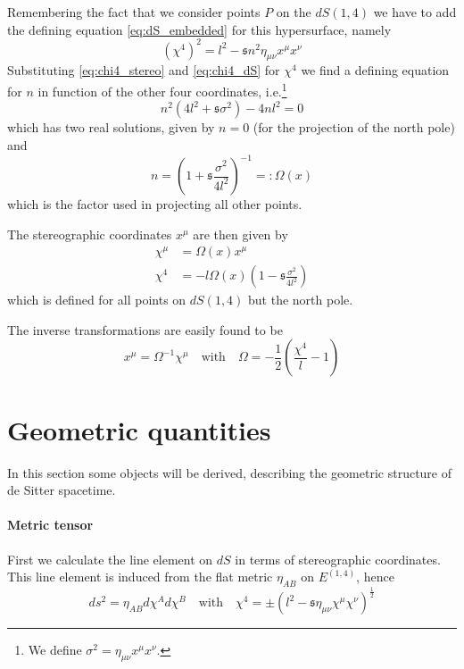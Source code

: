 \documentclass[10pt]{article}
\newcommand{\mrm}{\mathrm}
\newcommand{\sfr}{\mathfrak{s}}
\begin{document}
Remembering the fact that we consider points $P$ on the $dS(1,4)$ 
we have to add
the defining equation \eqref{eq:dS_embedded} for this 
hypersurface, namely
\begin{equation}\label{eq:chi4_dS}
(\chi^{4})^{2} = l^2 - \sfr n^2\eta_{\mu\nu}x^\mu x^\nu
\end{equation}
Substituting \eqref{eq:chi4_stereo} and \eqref{eq:chi4_dS} for 
$\chi^4$ we find
a defining equation for $n$ in function of the other four 
coordinates, i.e.\footnote{We define $\sigma^2=\eta_{\mu\nu}x^\mu 
	x^\nu$.}
\begin{equation}
n^2(4l^2 + \sfr \sigma^2)-4nl^2 = 0
\end{equation}
which has two real solutions, given by $n=0$ (for the projection 
of the north pole) and
\begin{equation}
	n = \left(1 + \sfr\frac{\sigma^2}{4l^2}\right)^{-1} =: 
	\Omega(x)
\end{equation}
which is the factor used in projecting all other points.

The stereographic coordinates $x^\mu$ are then given by
\begin{align}
	\chi^\mu &= \Omega(x)x^\mu \\
	\chi^4 &= -l\Omega(x)\left(1-\sfr\frac{\sigma^2}{4l^2}\right)
\end{align}
which is defined for all points on $dS(1,4)$ but the north pole.

The inverse transformations are easily found to be
\begin{equation}
	x^\mu = \Omega^{-1}\chi^\mu \quad \mrm{with} \quad \Omega = 
	-\frac{1}{2} \left( \frac{\chi^4}{l} - 1 \right)
\end{equation}

\section{Geometric quantities}

In this section some objects will be derived, describing the 
geometric structure of de Sitter spacetime.

\paragraph{Metric tensor}
First we calculate the line element on $dS$ in terms of 
stereographic coordinates.  This line element is induced from the 
flat metric $\eta_{AB}$ on $E^{(1,4)}$, hence
\begin{equation}
	ds^2 = \eta_{AB}d\chi^A d\chi^B \quad \text{with} \quad
	\chi^4 = \pm(l^2 -\sfr \eta_{\mu\nu} \chi^\mu 
	\chi^\nu)^{\frac{1}{2}}
\end{equation}
\end{document}
